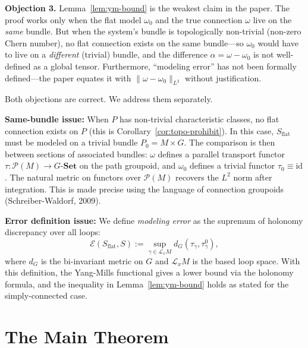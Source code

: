 \documentclass[12pt]{amsart}
\theoremstyle{plain}
\theoremstyle{definition}
\begin{document}
\begin{auditbox}
\textbf{Objection 3.} Lemma~\ref{lem:ym-bound} is the weakest claim in the
paper. The proof works only when the flat model $\omega_0$ and the true
connection $\omega$ live on the \emph{same} bundle. But when the system's
bundle is topologically non-trivial (non-zero Chern number), no flat
connection exists on the same bundle---so $\omega_0$ would have to live on a
\emph{different} (trivial) bundle, and the difference $\alpha = \omega -
\omega_0$ is not well-defined as a global tensor. Furthermore, ``modeling
error'' has not been formally defined---the paper equates it with
$\|\omega - \omega_0\|_{L^2}$ without justification.
\end{auditbox}

\begin{replybox}
Both objections are correct. We address them separately.

\textbf{Same-bundle issue:} When $P$ has non-trivial characteristic classes,
no flat connection exists on $P$ (this is Corollary~\ref{cor:topo-prohibit}).
In this case, $S_{\mathrm{flat}}$ must be modeled on a trivial bundle
$P_0 = M \times G$. The comparison is then between sections of associated
bundles: $\omega$ defines a parallel transport functor $\tau: \mathcal{P}(M)
\to G\text{-}\mathbf{Set}$ on the path groupoid, and $\omega_0$ defines a
trivial functor $\tau_0 \equiv \mathrm{id}$. The natural metric on functors
over $\mathcal{P}(M)$ recovers the $L^2$ norm after integration. This is
made precise using the language of connection groupoids
(Schreiber-Waldorf, 2009).

\textbf{Error definition issue:} We define \emph{modeling error} as the
supremum of holonomy discrepancy over all loops:
\[
  \mathcal{E}(S_{\mathrm{flat}}, S) 
    := \sup_{\gamma \in \mathcal{L}_x M} 
      d_G(\tau_\gamma, \tau^0_\gamma),
\]
where $d_G$ is the bi-invariant metric on $G$ and $\mathcal{L}_x M$ is the
based loop space. With this definition, the Yang-Mills functional gives a
lower bound via the holonomy formula, and the inequality in
Lemma~\ref{lem:ym-bound} holds as stated for the simply-connected case.
\end{replybox}

\section{The Main Theorem}
\label{sec:main}
\end{document}
